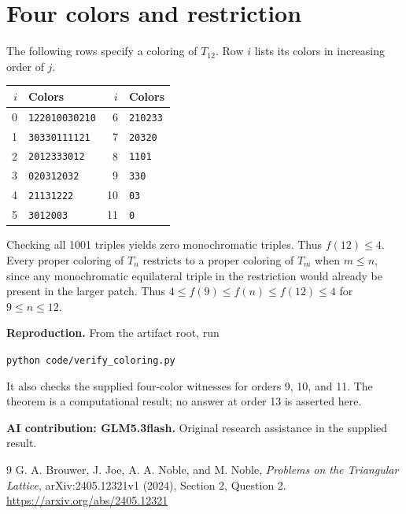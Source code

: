 \documentclass[11pt]{amsart}
\begin{document}
\section{Four colors and restriction}
The following rows specify a coloring of $T_{12}$. Row $i$ lists its colors in increasing order of $j$.
\begin{center}
\begin{tabular}{r@{\quad}l r@{\quad}l}
\toprule
$i$ & Colors & $i$ & Colors\\
\midrule
0 & \texttt{122010030210} & 6 & \texttt{210233} \\
1 & \texttt{30330111121} & 7 & \texttt{20320} \\
2 & \texttt{2012333012} & 8 & \texttt{1101} \\
3 & \texttt{020312032} & 9 & \texttt{330} \\
4 & \texttt{21131222} & 10 & \texttt{03} \\
5 & \texttt{3012003} & 11 & \texttt{0} \\
\bottomrule
\end{tabular}
\end{center}
Checking all 1001 triples yields zero monochromatic triples. Thus $f(12)\le4$. Every proper coloring of $T_n$ restricts to a proper coloring of $T_m$ when $m\le n$, since any monochromatic equilateral triple in the restriction would already be present in the larger patch. Thus $4\le f(9)\le f(n)\le f(12)\le4$ for $9\le n\le12$.
\par
\textbf{Reproduction.} From the artifact root, run
\begin{center}\texttt{python code/verify\_coloring.py}\end{center} It also checks the supplied four-color witnesses for orders 9, 10, and 11. The theorem is a computational result; no answer at order 13 is asserted here.
\par
\textbf{AI contribution: GLM5.3flash.} Original research assistance in the supplied result.
\begin{thebibliography}{9}
 G. A. Brouwer, J. Joe, A. A. Noble, and M. Noble, \emph{Problems on the Triangular Lattice}, arXiv:2405.12321v1 (2024), Section 2, Question 2. \url{https://arxiv.org/abs/2405.12321}
\end{thebibliography}
\end{document}
